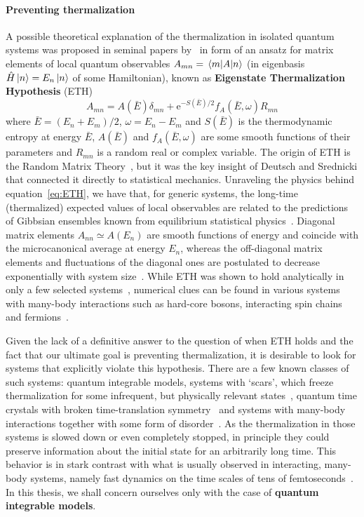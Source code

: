 \paragraph{Preventing thermalization} A possible theoretical explanation of the thermalization in isolated quantum systems
was proposed in seminal papers by~\textcite{Deutsch1991,Srednicki1994} in form of an ansatz for matrix elements of
local quantum observables \(A_{mn} = \matrixel{m}{A}{n}\) (in eigenbasis \(\hat{H} \ket{n}=E_n \ket{n}\) of some Hamiltonian),
known as \textbf{Eigenstate Thermalization Hypothesis} (ETH)
\begin{equation}
    A_{mn} = A(\bar{E} ) \delta_{mn} + \mathrm{e}^{-S(\bar{E})/2}f_{A}(\bar{E} ,\omega)R_{mn}
    \label{eq:ETH}
\end{equation}
where \(\bar{E}  = (E_n+E_m)/2\), \(\omega=E_n-E_m\) and \(S(\bar{E} )\) is
the thermodynamic entropy at energy \(\bar{E} \),  \(A(\bar{E} )\) and \(f_{A}(\bar{E} ,\omega)\) are
some smooth functions of their parameters and
\(R_{mn}\) is a random real or complex variable. The origin of ETH is the Random Matrix Theory~\autocite{Wigner1955, Mehta2004},
but it was the key insight of Deutsch and Srednicki that connected it directly to statistical mechanics.
Unraveling the physics behind equation~\eqref{eq:ETH}, we have that, for generic systems,
the long-time (thermalized) expected values of local observables are related to the predictions of Gibbsian ensembles
known from equilibrium statistical physics~\autocite{DAlessio2016}. Diagonal matrix elements \(A_{nn} \simeq A(E_n)\) are smooth functions of energy and
coincide with the microcanonical average at energy \(E_n\), whereas the off-diagonal matrix elements and fluctuations
of the diagonal ones are postulated to decrease exponentially with system size~\autocite{Beugeling2014}.
While ETH was shown to hold analytically in only a few selected systems~\autocite{Magan2016}, numerical clues can be
found in various systems with many-body interactions such as hard-core bosons, interacting spin
chains~\autocite{Santos2010a,Rigol2010,Khatami2013,Rigol2009a} and fermions~\autocite{Neuenhahn2012,Rigol2009}.

Given the lack of a definitive answer to the question of when ETH holds and the fact that our ultimate goal is preventing thermalization, it is desirable to look for systems
that explicitly violate this hypothesis. There are a few known classes of such systems:
quantum integrable models, systems with `scars', which freeze thermalization for
some infrequent, but physically relevant states~\autocite{Turner2018a, Turner2018}, quantum time crystals with
broken time-translation symmetry~\autocite{Wilczek2012, Sacha2017} and systems with many-body interactions together
with some form of disorder~\autocite{Basko2006}. As the thermalization in those systems is slowed down or even
completely stopped, in principle they could preserve information about the initial state for an arbitrarily long time.
This behavior is in stark contrast with what is usually observed in interacting, many-body systems, namely fast
dynamics on the time scales of tens of femtoseconds~\autocite{DalConte2015}.
In this thesis, we shall concern ourselves only with the case of \textbf{quantum integrable models}.

